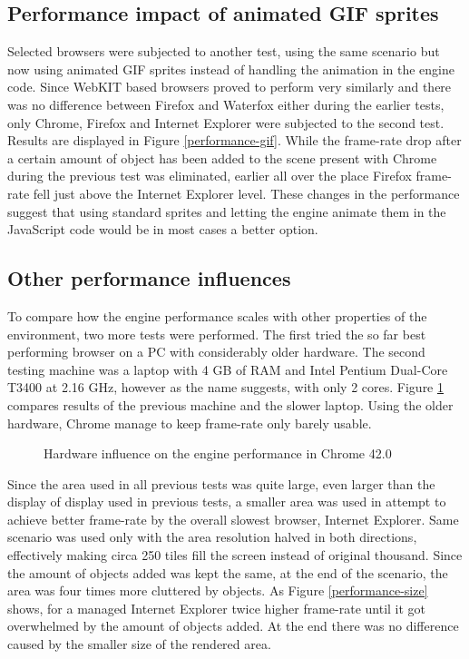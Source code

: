 \documentclass[11pt,oneside, final]{fithesis2}
\begin{document}
\subsection{Performance impact of animated GIF sprites}
Selected browsers were subjected to another test, using the same scenario but now using animated GIF sprites instead of handling the animation in the engine code. Since WebKIT based browsers proved to perform very similarly and there was no difference between Firefox and Waterfox either during the earlier tests, only Chrome, Firefox and Internet Explorer were subjected to the second test. Results are displayed in Figure \ref{performance-gif}. While the frame-rate drop after a certain amount of object has been added to the scene present with Chrome during the previous test was eliminated, earlier all over the place Firefox frame-rate fell just above the Internet Explorer level. These changes in the performance suggest that using standard sprites and letting the engine animate them in the JavaScript code would be in most cases a better option.

\subsection{Other performance influences}
To compare how the engine performance scales with other properties of the environment, two more tests were performed. The first tried the so far best performing browser on a PC with considerably older hardware. The second testing machine was a laptop with 4 GB of RAM and Intel Pentium Dual-Core T3400 at 2.16 GHz, however as the name suggests, with only 2 cores. Figure \ref{performance-hw} compares results of the previous machine and the slower laptop. Using the older hardware, Chrome manage to keep frame-rate only barely usable.

\begin{figure}[h]
	\centering
	
	\caption{Hardware influence on the engine performance in Chrome 42.0}
	\label{performance-hw}
\end{figure}

Since the area used in all previous tests was quite large, even larger than the display of display used in previous tests, a smaller area was used in attempt to achieve better frame-rate by the overall slowest browser, Internet Explorer. Same scenario was used only with the area resolution halved in both directions, effectively making circa 250 tiles fill the screen instead of original thousand. Since the amount of objects added was kept the same, at the end of the scenario, the area was four times more cluttered by objects. As Figure \ref{performance-size} shows, for a managed Internet Explorer twice higher frame-rate until it got overwhelmed by the amount of objects added. At the end there was no difference caused by the smaller size of the rendered area.
\end{document}
